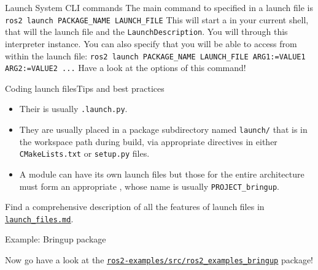 \begin{frame}{Launch System CLI commands}
  The main command to  specified in a launch file is
  \newline\newline
  \texttt{ros2 launch PACKAGE\_NAME LAUNCH\_FILE}
  \newline\newline
  This will start a  in your current shell, that will  the launch file and  the \texttt{LaunchDescription}. You will  through this interpreter instance. You can also specify  that you will be able to access from within the launch file:
  \newline\newline
  \texttt{ros2 launch PACKAGE\_NAME LAUNCH\_FILE ARG1:=VALUE1 ARG2:=VALUE2 ...}
  \newline\newline
  Have a look at the options of this command!
\end{frame}

\begin{frame}{Coding launch files}{Tips and best practices}
	\begin{itemize}
		\item Their  is usually \texttt{.launch.py}.
		\item They are usually placed in a package subdirectory named \texttt{launch/} that is  in the workspace path during build, via appropriate directives in either \texttt{CMakeLists.txt} or \texttt{setup.py} files.
		\item A module can have its own launch files but those for the entire architecture must form an appropriate , whose name is usually \texttt{PROJECT\_bringup}.
	\end{itemize}
	\begin{block}{}
		\centering
		Find a comprehensive description of all the features of launch files in \href{https://github.com/IntelligentSystemsLabUTV/ros2-examples/blob/humble/launch_files.md}{\color{blue}\underline{\texttt{launch\_files.md}}}.
	\end{block}
\end{frame}

\begin{frame}{Example: Bringup package}
  \begin{block}{}
    \centering
	  Now go have a look at the \href{https://github.com/IntelligentSystemsLabUTV/ros2-examples/tree/humble/src/ros2_examples_bringup}{\color{blue}\underline{\texttt{ros2-examples/src/ros2\_examples\_bringup}}} package!
  \end{block}
\end{frame}
